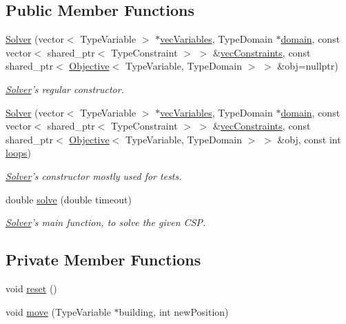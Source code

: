 \subsection*{Public Member Functions}
\begin{DoxyCompactItemize}
\item 
\hyperlink{classghost_1_1Solver_aee74bbdf00494dc209d4909bf9fcb544}{Solver} (vector$<$ Type\-Variable $>$ $\ast$\hyperlink{classghost_1_1Solver_a2d033a454234b2277aabdcc4d89eaba2}{vec\-Variables}, Type\-Domain $\ast$\hyperlink{classghost_1_1Solver_ad9292e9219261ba8058fec05b453c0c9}{domain}, const vector$<$ shared\-\_\-ptr$<$ Type\-Constraint $>$ $>$ \&\hyperlink{classghost_1_1Solver_a170746edcfb777b12978444c2ab3962e}{vec\-Constraints}, const shared\-\_\-ptr$<$ \hyperlink{classghost_1_1Objective}{Objective}$<$ Type\-Variable, Type\-Domain $>$ $>$ \&obj=nullptr)
\begin{DoxyCompactList}\small\item\em \hyperlink{classghost_1_1Solver}{Solver}'s regular constructor. \end{DoxyCompactList}\item 
\hyperlink{classghost_1_1Solver_a512335329b22a91700bdfa7870f053e9}{Solver} (vector$<$ Type\-Variable $>$ $\ast$\hyperlink{classghost_1_1Solver_a2d033a454234b2277aabdcc4d89eaba2}{vec\-Variables}, Type\-Domain $\ast$\hyperlink{classghost_1_1Solver_ad9292e9219261ba8058fec05b453c0c9}{domain}, const vector$<$ shared\-\_\-ptr$<$ Type\-Constraint $>$ $>$ \&\hyperlink{classghost_1_1Solver_a170746edcfb777b12978444c2ab3962e}{vec\-Constraints}, const shared\-\_\-ptr$<$ \hyperlink{classghost_1_1Objective}{Objective}$<$ Type\-Variable, Type\-Domain $>$ $>$ \&obj, const int \hyperlink{classghost_1_1Solver_aa6a77e14862a9be467e6c6c76124b526}{loops})
\begin{DoxyCompactList}\small\item\em \hyperlink{classghost_1_1Solver}{Solver}'s constructor mostly used for tests. \end{DoxyCompactList}\item 
double \hyperlink{classghost_1_1Solver_a30dd2769fb30ac42d231d2c305dcdf13}{solve} (double timeout)
\begin{DoxyCompactList}\small\item\em \hyperlink{classghost_1_1Solver}{Solver}'s main function, to solve the given C\-S\-P. \end{DoxyCompactList}\end{DoxyCompactItemize}
\subsection*{Private Member Functions}
\begin{DoxyCompactItemize}
\item 
void \hyperlink{classghost_1_1Solver_a43db35b71a3e494ce208622cc45cbeb0}{reset} ()
\item 
void \hyperlink{classghost_1_1Solver_af1176494b45226e87edefa0b39babf62}{move} (Type\-Variable $\ast$building, int new\-Position)
\end{DoxyCompactItemize}

